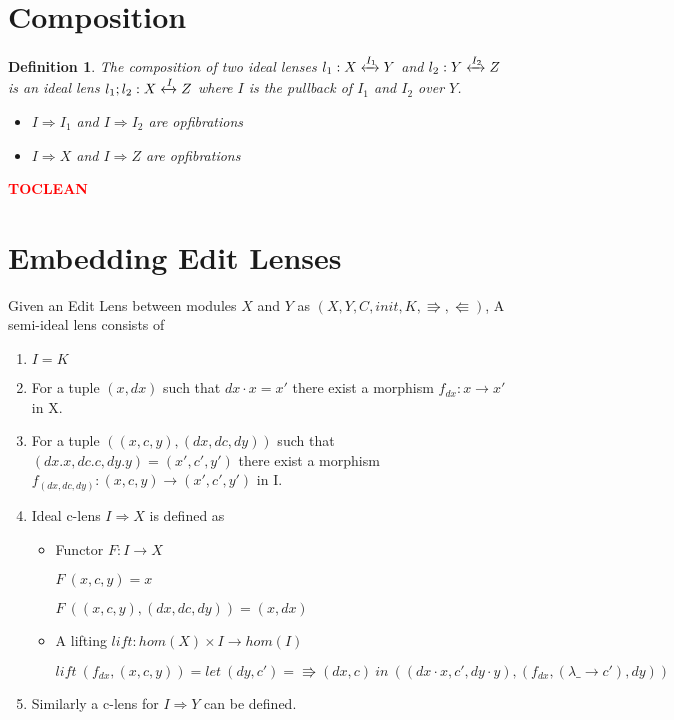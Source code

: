 \documentclass[a4paper,10pt]{article}
\newtheorem{definition}{Definition}
\newcommand{\finish}[1]{#1}
\newcommand{\comment}[1]{\finish{\textbf{\textcolor{red}{#1}}}}
\begin{document}
\section{Composition}
\begin{definition}
The composition of two ideal lenses $l_1: X \xleftrightarrow{I_1} Y$
and $l_2: Y \xleftrightarrow{I_2} Z$ is an ideal lens $l_1;l_2: X
\xleftrightarrow{I} Z$ where $I$ is the pullback of $I_1$ and $I_2$
over $Y$.

\begin{itemize}
 \item $I \Rightarrow I_1$ and $I \Rightarrow I_2$ are
  opfibrations
 \item $I \Rightarrow X$ and $I \Rightarrow Z$ are
  opfibrations 
\end{itemize}
\end{definition}

\comment{TOCLEAN}
\section{Embedding Edit Lenses}
Given an Edit Lens between modules $X$ and $Y$ as $(X,Y,C,init,K,\Rrightarrow,\Lleftarrow)$, A semi-ideal lens consists of
\begin{enumerate}
\item $I = K$
\item For a tuple $(x,dx)$ such that $dx \cdot x=x'$ there
  exist a morphism $f_{dx}: x \to x'$ in X. 
\item For a tuple $((x,c,y),(dx,dc,dy))$ such
  that $(dx.x,dc.c,dy.y)=(x',c',y')$ there exist a morphism $f_{(dx,dc,dy)}:
  (x,c,y) \to (x',c',y')$ in I.
\item Ideal c-lens $I \Rightarrow X$ is defined as 

\begin {itemize}
\item Functor $F: I \to X$ 

$F~(x,c,y) = x$ 

$F~((x,c,y),(dx,dc,dy))=(x,dx)$ 
\item A lifting $lift: hom(X) \times I \to hom(I)$ 
      
$lift~(f_{dx},(x,c,y))=let~(dy,c')=\Rrightarrow(dx,c)~in~((dx \cdot x, c', dy \cdot y), (f_{dx},(\lambda
  \_ \to c'),dy))$
\end{itemize}
\item Similarly a c-lens for $I \Rightarrow Y$ can be defined.
\end{enumerate}
\end{document}
